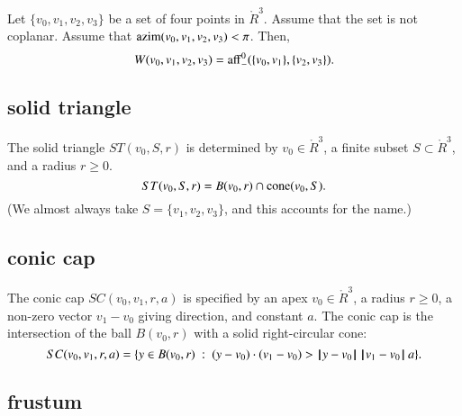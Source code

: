 \begin{lemma} Let $\{v_0,v_1,v_2,v_3\}$ be a set of four points
in $\ring{R}^3$.  Assume that the set is not coplanar.
Assume that ${\operatorname{azim}}(v_0,v_1,v_2,v_3)<\pi$.
Then,
   $$W(v_0,v_1,v_2,v_3) = {\operatorname{aff}}^0_-(\{v_0,v_1\},\{v_2,v_3\}).$$
\end{lemma}


\subsection{solid triangle}

\begin{definition} The solid triangle $ST(v_0,S,r)$ is
determined by  $v_0\in\ring{R}^3$, a finite subset $S\subset\ring{R}^3$,
and a radius $r\ge0$. 
    $$
    ST(v_0,S,r) = 
    B(v_0,r)\cap {\operatorname{cone}}(v_0,S).
    $$
(We almost always take $S=\{v_1,v_2,v_3\}$, and this accounts for
the name.)
\end{definition}



\subsection{conic cap}


\begin{definition}
The conic cap $SC(v_0,v_1,r,a)$ is specified by an apex
$v_0\in\ring{R}^3$, a radius $r\ge0$, a non-zero vector $v_1-v_0$ giving
direction, and constant $a$.  The conic cap is the intersection of
the ball $B(v_0,r)$ with a solid right-circular cone:
    $$
    SC(v_0,v_1,r,a)=\{y \in B(v_0,r) \ :\  (y-v_0)\cdot (v_1-v_0) > {\hskip0.1em|\hskip-0.15em|\hskip0.1em}y - v_0{\hskip0.1em|\hskip-0.15em|\hskip0.1em}\, {\hskip0.1em|\hskip-0.15em|\hskip0.1em}v_1 - v_0{\hskip0.1em|\hskip-0.15em|\hskip0.1em}\, a\}.
    $$
\end{definition}

\subsection{frustum}

